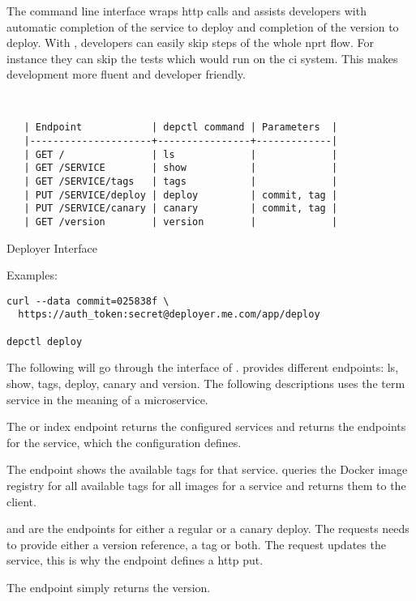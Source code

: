 The \depctl command line interface wraps http calls and assists developers with automatic
completion of the service to deploy and completion of the version to deploy. With \depctl,
developers can easily skip steps of the whole \gls{nprt} flow. For instance they can skip
the tests which would run on the \gls{ci} system. This makes development more fluent and
developer friendly.

\begin{table}[!htbp]
\begin{verbatim}


   | Endpoint            | depctl command | Parameters  |
   |---------------------+----------------+-------------|
   | GET /               | ls             |             |
   | GET /SERVICE        | show           |             |
   | GET /SERVICE/tags   | tags           |             |
   | PUT /SERVICE/deploy | deploy         | commit, tag |
   | PUT /SERVICE/canary | canary         | commit, tag |
   | GET /version        | version        |             |

\end{verbatim}
\caption{Deployer Interface}
\label{tab:interface}
\end{table}
Examples:
\begin{verbatim}
curl --data commit=025838f \
  https://auth_token:secret@deployer.me.com/app/deploy

depctl deploy
\end{verbatim}

The following will go through the interface of \deployer. \deployer provides different
endpoints: ls, show, tags, deploy, canary and version. The following descriptions uses the
term service in the meaning of a microservice.

The  or index endpoint returns the configured services and returns the endpoints
for the service, which the configuration defines.

The  endpoint shows the available tags for that service. \deployer queries the
Docker image registry for all available tags for all images for a service and returns them
to the client.

 and  are the endpoints for either a regular or a canary
deploy. The requests needs to provide either a version reference, a tag or both. The
request updates the service, this is why the endpoint defines a http put.

The  endpoint simply returns the \deployer version.

